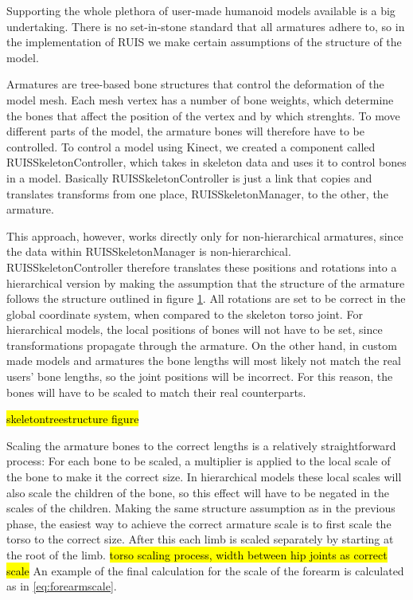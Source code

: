 \documentclass[12pt,a4paper,oneside,pdftex]{report}
\begin{document}
Supporting the whole plethora of user-made humanoid models available is a big undertaking. There is no set-in-stone standard that all armatures adhere to, so in the implementation of RUIS we make certain assumptions of the structure of the model.

Armatures are tree-based bone structures that control the deformation of the model mesh. Each mesh vertex has a number of bone weights, which determine the bones that affect the position of the vertex and by which strenghts. To move different parts of the model, the armature bones will therefore have to be controlled. To control a model using Kinect, we created a component called RUISSkeletonController, which takes in skeleton data and uses it to control bones in a model. Basically RUISSkeletonController is just a link that copies and translates transforms from one place, RUISSkeletonManager, to the other, the armature.

This approach, however, works directly only for non-hierarchical armatures, since the data within RUISSkeletonManager is non-hierarchical. RUISSkeletonController therefore translates these positions and rotations into a hierarchical version by making the assumption that the structure of the armature follows the structure outlined in figure \ref{fig:skeletontreestructure}. All rotations are set to be correct in the global coordinate system, when compared to the skeleton torso joint. For hierarchical models, the local positions of bones will not have to be set, since transformations propagate through the armature. On the other hand, in custom made models and armatures the bone lengths will most likely not match the real users' bone lengths, so the joint positions will be incorrect. For this reason, the bones will have to be scaled to match their real counterparts.

\hl{skeletontreestructure figure}
\begin{figure}
    \label{fig:skeletontreestructure}
\end{figure}

Scaling the armature bones to the correct lengths is a relatively straightforward process: For each bone to be scaled, a multiplier is applied to the local scale of the bone to make it the correct size. In hierarchical models these local scales will also scale the children of the bone, so this effect will have to be negated in the scales of the children. Making the same structure assumption as in the previous phase, the easiest way to achieve the correct armature scale is to first scale the torso to the correct size. After this each limb is scaled separately by starting at the root of the limb. \hl{torso scaling process, width between hip joints as correct scale} An example of the final calculation for the scale of the forearm is calculated as in \ref{eq:forearmscale}. 
\end{document}

